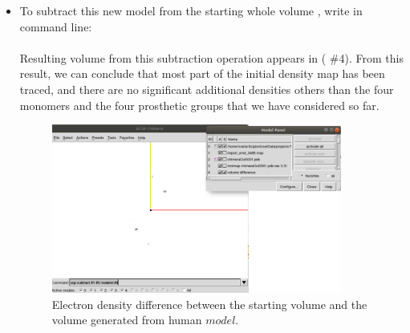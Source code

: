 \begin{itemize}
\begin{itemize}
  \item To subtract this new model from the starting whole volume , write in \chimera command line:\\
  
   \\
  
  Resulting volume from this subtraction operation appears in  ( \#4). From this result, we can conclude that most part of the initial density map has been traced, and there are no significant additional densities others than the four monomers and the four prosthetic groups that we have considered so far.
  
  \begin{figure}[H]
    \centering 
    \captionsetup{width=.7\linewidth} 
    \includegraphics[width=0.90\textwidth]{Images/Fig44}
    \caption{Electron density difference between the starting volume  and the volume generated from human  $model$.}
    \label{fig:chimera_operate_vol_3}
   \end{figure}
  
  
  \end{itemize}
 
\end{itemize}
